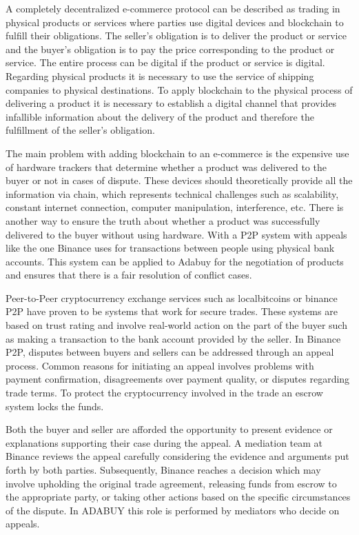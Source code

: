 \documentclass[12pt]{article}
\begin{document}
A completely decentralized e-commerce protocol can be described as trading in physical products or services where parties use digital devices and blockchain to fulfill their obligations.
The seller's obligation is to deliver the product or service and the buyer's obligation is to pay the price corresponding to the product or service. 
The entire process can be digital if the product or service is digital.
Regarding physical products it is necessary to use the service of shipping companies to physical destinations.
To apply blockchain to the physical process of delivering a product it is necessary to establish a digital channel that provides infallible information about the delivery of the product and therefore the fulfillment of the seller's obligation. 

The main problem with adding blockchain to an e-commerce is the expensive use of hardware trackers that determine whether a product was delivered to the buyer or not in cases of dispute. These devices should theoretically provide all the information via chain, which represents technical challenges such as scalability, constant internet connection, computer manipulation, interference, etc. There is another way to ensure the truth about whether a product was successfully delivered to the buyer without using hardware. With a P2P system with appeals like the one Binance uses for transactions between people using physical bank accounts. This system can be applied to Adabuy for the negotiation of products and ensures that there is a fair resolution of conflict cases.

Peer-to-Peer cryptocurrency exchange services such as localbitcoins or binance P2P have proven to be systems that work for secure trades. These systems are based on trust rating and involve real-world action on the part of the buyer such as making a transaction to the bank account provided by the seller. In Binance P2P, disputes between buyers and sellers can be addressed through an appeal process. Common reasons for initiating an appeal involves problems with payment confirmation, disagreements over payment quality, or disputes regarding trade terms. To protect the cryptocurrency involved in the trade an escrow system locks the funds.

Both the buyer and seller are afforded the opportunity to present evidence or explanations supporting their case during the appeal. A mediation team at Binance reviews the appeal carefully considering the evidence and arguments put forth by both parties. Subsequently, Binance reaches a decision which may involve upholding the original trade agreement, releasing funds from escrow to the appropriate party, or taking other actions based on the specific circumstances of the dispute. In ADABUY this role is performed by mediators who decide on appeals.
\end{document}
